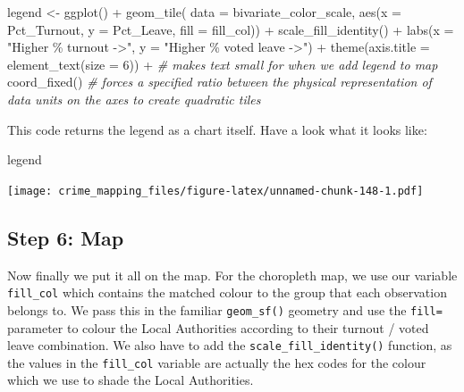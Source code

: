 \documentclass[
]{book}
\newenvironment{Shaded}{\begin{snugshade}}{\end{snugshade}}
\newcommand{\AttributeTok}[1]{\textcolor[rgb]{0.77,0.63,0.00}{#1}}
\newcommand{\CommentTok}[1]{\textcolor[rgb]{0.56,0.35,0.01}{\textit{#1}}}
\newcommand{\DecValTok}[1]{\textcolor[rgb]{0.00,0.00,0.81}{#1}}
\newcommand{\FunctionTok}[1]{\textcolor[rgb]{0.00,0.00,0.00}{#1}}
\newcommand{\NormalTok}[1]{#1}
\newcommand{\OtherTok}[1]{\textcolor[rgb]{0.56,0.35,0.01}{#1}}
\newcommand{\SpecialCharTok}[1]{\textcolor[rgb]{0.00,0.00,0.00}{#1}}
\newcommand{\StringTok}[1]{\textcolor[rgb]{0.31,0.60,0.02}{#1}}
\begin{document}
\begin{Shaded}
\begin{Highlighting}[]
\NormalTok{legend }\OtherTok{\textless{}{-}} \FunctionTok{ggplot}\NormalTok{() }\SpecialCharTok{+}
  \FunctionTok{geom\_tile}\NormalTok{( }\AttributeTok{data =}\NormalTok{ bivariate\_color\_scale, }\FunctionTok{aes}\NormalTok{(}\AttributeTok{x =}\NormalTok{ Pct\_Turnout, }\AttributeTok{y =}\NormalTok{ Pct\_Leave, }\AttributeTok{fill =}\NormalTok{ fill\_col)) }\SpecialCharTok{+}
  \FunctionTok{scale\_fill\_identity}\NormalTok{() }\SpecialCharTok{+}
  \FunctionTok{labs}\NormalTok{(}\AttributeTok{x =} \StringTok{"Higher \% turnout {-}\textgreater{}"}\NormalTok{,}
       \AttributeTok{y =} \StringTok{"Higher \% voted leave {-}\textgreater{}"}\NormalTok{) }\SpecialCharTok{+}
  \FunctionTok{theme}\NormalTok{(}\AttributeTok{axis.title =} \FunctionTok{element\_text}\NormalTok{(}\AttributeTok{size =} \DecValTok{6}\NormalTok{)) }\SpecialCharTok{+}   \CommentTok{\# makes text small for when we add legend to map}
  \FunctionTok{coord\_fixed}\NormalTok{()  }\CommentTok{\# forces a specified ratio between the physical representation of data units on the axes to create quadratic tiles}
\end{Highlighting}
\end{Shaded}

This code returns the legend as a chart itself. Have a look what it looks like:

\begin{Shaded}
\begin{Highlighting}[]
\NormalTok{legend}
\end{Highlighting}
\end{Shaded}

\texttt{[image: crime\_mapping\_files/figure-latex/unnamed-chunk-148-1.pdf]}

\hypertarget{step-6-map}{%
\subsection{Step 6: Map}\label{step-6-map}}

Now finally we put it all on the map. For the choropleth map, we use our variable \texttt{fill\_col} which contains the matched colour to the group that each observation belongs to. We pass this in the familiar \texttt{geom\_sf()} geometry and use the \texttt{fill=} parameter to colour the Local Authorities according to their turnout / voted leave combination. We also have to add the \texttt{scale\_fill\_identity()} function, as the values in the \texttt{fill\_col} variable are actually the hex codes for the colour which we use to shade the Local Authorities.
\end{document}

